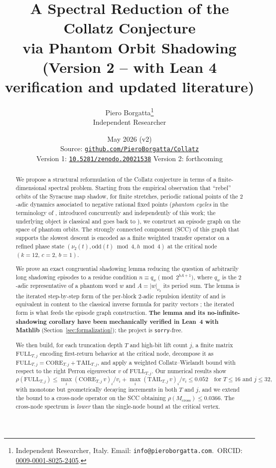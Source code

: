 \documentclass[11pt,a4paper]{article}
\title{
  A Spectral Reduction of the Collatz Conjecture \\
  via Phantom Orbit Shadowing
  \\[4pt]\large\normalfont (Version 2 -- with Lean 4 verification and updated literature)
}
\author{
  Piero Borgatta\thanks{Independent Researcher, Italy. Email: \texttt{info@pieroborgatta.com}.\
    ORCID: \href{https://orcid.org/0009-0001-8025-2405}{0009-0001-8025-2405}.} \\
  \small Independent Researcher
}
\date{May 2026 (v2) \\[2pt]
  \small\normalfont
  Source: \href{https://github.com/PieroBorgatta/Collatz}{\texttt{github.com/PieroBorgatta/Collatz}}
  \\[2pt]
  \small\normalfont
  Version 1: \href{https://doi.org/10.5281/zenodo.20021538}{\texttt{10.5281/zenodo.20021538}} \quad
  Version 2: forthcoming
}
\theoremstyle{definition}
\newcommand{\full}{\mathrm{FULL}}
\newcommand{\core}{\mathrm{CORE}}
\newcommand{\tail}{\mathrm{TAIL}}
\newcommand{\spec}{\rho}
\begin{document}
\maketitle

\begin{abstract}
We propose a structural reformulation of the Collatz conjecture in
terms of a finite-dimensional spectral problem. Starting from the
empirical observation that ``rebel'' orbits of the Syracuse map
shadow, for finite stretches, periodic rational points of the
$2$-adic dynamics associated to negative rational fixed points
(\emph{phantom cycles} in the terminology of \cite{chang2026},
introduced concurrently and independently of this work; the
underlying object is classical and goes back to
\cite{lagarias1985}), we construct an episode graph on the space of
phantom orbits. The strongly connected component (SCC) of this graph
that supports the slowest descent is encoded as a finite weighted
transfer operator on a refined phase state
$(\nu_2(t), \mathrm{odd}(t)\bmod 4, h\bmod 4)$ at the critical node
$(k=12,\, c=2,\, b=1)$.

We prove an exact congruential shadowing lemma reducing the question
of arbitrarily long shadowing episodes to a residue condition
$n\equiv q_w\pmod{2^{bA+1}}$, where $q_w$ is the $2$-adic
representative of a phantom word $w$ and $A=|w|_{\nu_2}$ its period
sum. The lemma is the iterated step-by-step form of the per-block
$2$-adic repulsion identity of \cite[Prop.~7.4]{chang2026} and is
equivalent in content to the classical inverse formula for parity
vectors \cite[Lemma~1]{rozier2025}; the iterated form is what feeds
the episode graph construction. \textbf{The lemma and its
no-infinite-shadowing corollary have been mechanically verified in
Lean~4 with Mathlib} (Section~\ref{sec:formalization}); the project
is \texttt{sorry}-free.

We then build, for each truncation depth $T$ and high-bit lift count
$j$, a finite matrix $\full_{T,j}$ encoding first-return behavior at
the critical node, decompose it as
$\full_{T,j} = \core_{T,j} + \tail_{T,j}$, and apply a weighted
Collatz--Wielandt bound \cite{lemmensnussbaum} with respect to the
right Perron eigenvector $v$ of $\full_{T,j}$. Our numerical results
show
\[
\spec(\full_{T,j})
\le
\max_i (\core_{T,j}\, v)_i / v_i + \max_i (\tail_{T,j}\, v)_i / v_i
\le 0.052
\quad
\text{for $T \le 16$ and $j \le 32$,}
\]
with monotone but geometrically decaying increments in both $T$ and
$j$, and we extend the bound to a cross-node operator on the SCC
obtaining $\spec(M_{\mathrm{cross}}) \le 0.0366$. The cross-node
spectrum is \emph{lower} than the single-node bound at the critical
vertex.


\end{abstract}
\end{document}
